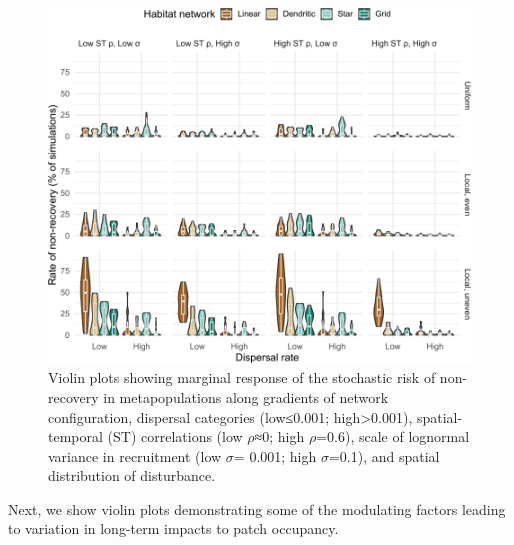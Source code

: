 \documentclass[
]{article}
\begin{document}
\begin{figure}[H]

{\centering \includegraphics{Managing_for_ecological_surprises_in_metapopulations_files/figure-latex/violin plots of risk of non-recovery-1} 

}

\caption{Violin plots showing marginal response of the stochastic risk of non-recovery in metapopulations along gradients of network configuration, dispersal categories (low≤0.001; high>0.001), spatial-temporal (ST) correlations (low $\rho$≈0; high $\rho$=0.6), scale of lognormal variance in recruitment (low $\sigma$= 0.001; high $\sigma$=0.1), and spatial distribution of disturbance.}\label{fig:violin plots of risk of non-recovery}
\end{figure}

Next, we show violin plots demonstrating some of the modulating factors
leading to variation in long-term impacts to patch occupancy.
\end{document}
